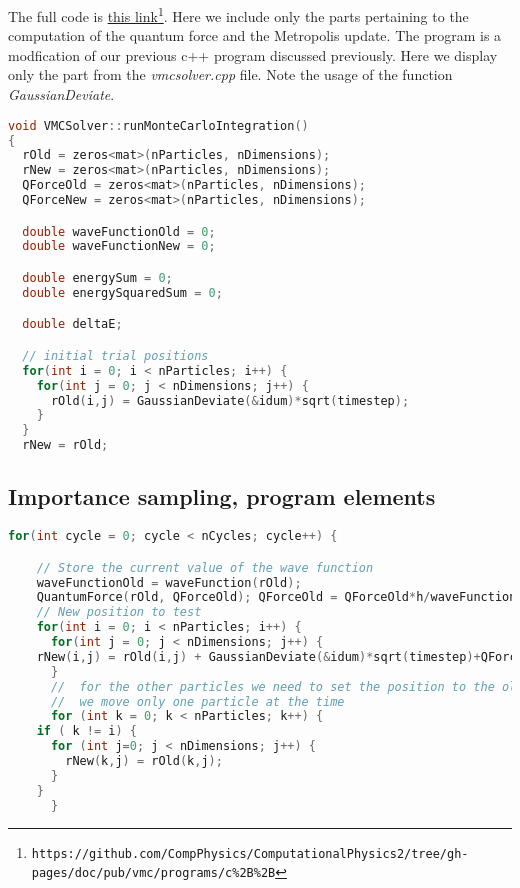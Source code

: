 \documentclass[graybox,sectrefs,envcountresetchap,open=right]{svmonodo}
\begin{document}
The full code is \href{{https://github.com/CompPhysics/ComputationalPhysics2/tree/gh-pages/doc/pub/vmc/programs/c%
\begin{lstlisting}[language=C++,style=blue1]
void VMCSolver::runMonteCarloIntegration()
{
  rOld = zeros<mat>(nParticles, nDimensions);
  rNew = zeros<mat>(nParticles, nDimensions);
  QForceOld = zeros<mat>(nParticles, nDimensions);
  QForceNew = zeros<mat>(nParticles, nDimensions);

  double waveFunctionOld = 0;
  double waveFunctionNew = 0;

  double energySum = 0;
  double energySquaredSum = 0;

  double deltaE;

  // initial trial positions
  for(int i = 0; i < nParticles; i++) {
    for(int j = 0; j < nDimensions; j++) {
      rOld(i,j) = GaussianDeviate(&idum)*sqrt(timestep);
    }
  }
  rNew = rOld;
\end{lstlisting}



\subsection{Importance sampling, program elements}

\begin{lstlisting}[language=C++,style=blue1]
  for(int cycle = 0; cycle < nCycles; cycle++) {

    // Store the current value of the wave function
    waveFunctionOld = waveFunction(rOld);
    QuantumForce(rOld, QForceOld); QForceOld = QForceOld*h/waveFunctionOld;
    // New position to test
    for(int i = 0; i < nParticles; i++) {
      for(int j = 0; j < nDimensions; j++) {
	rNew(i,j) = rOld(i,j) + GaussianDeviate(&idum)*sqrt(timestep)+QForceOld(i,j)*timestep*D;
      }
      //  for the other particles we need to set the position to the old position since
      //  we move only one particle at the time
      for (int k = 0; k < nParticles; k++) {
	if ( k != i) {
	  for (int j=0; j < nDimensions; j++) {
	    rNew(k,j) = rOld(k,j);
	  }
	} 
      }
\end{lstlisting}
\end{document}
